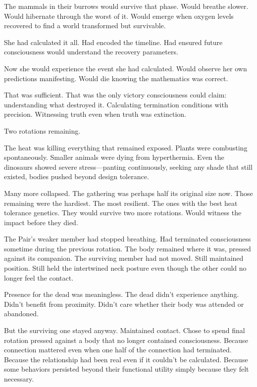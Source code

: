 The mammals in their burrows would survive that phase. Would breathe slower. Would hibernate through the worst of it. Would emerge when oxygen levels recovered to find a world transformed but survivable.

She had calculated it all. Had encoded the timeline. Had ensured future consciousness would understand the recovery parameters.

Now she would experience the event she had calculated. Would observe her own predictions manifesting. Would die knowing the mathematics was correct.

That was sufficient. That was the only victory consciousness could claim: understanding what destroyed it. Calculating termination conditions with precision. Witnessing truth even when truth was extinction.

\scenebreak

Two rotations remaining.

The heat was killing everything that remained exposed. Plants were combusting spontaneously. Smaller animals were dying from hyperthermia. Even the dinosaurs showed severe stress—panting continuously, seeking any shade that still existed, bodies pushed beyond design tolerance.

Many more collapsed. The gathering was perhaps half its original size now. Those remaining were the hardiest. The most resilient. The ones with the best heat tolerance genetics. They would survive two more rotations. Would witness the impact before they died.

The Pair's weaker member had stopped breathing. Had terminated consciousness sometime during the previous rotation. The body remained where it was, pressed against its companion. The surviving member had not moved. Still maintained position. Still held the intertwined neck posture even though the other could no longer feel the contact.

Presence for the dead was meaningless. The dead didn't experience anything. Didn't benefit from proximity. Didn't care whether their body was attended or abandoned.

But the surviving one stayed anyway. Maintained contact. Chose to spend final rotation pressed against a body that no longer contained consciousness. Because connection mattered even when one half of the connection had terminated. Because the relationship had been real even if it couldn't be calculated. Because some behaviors persisted beyond their functional utility simply because they felt necessary.

